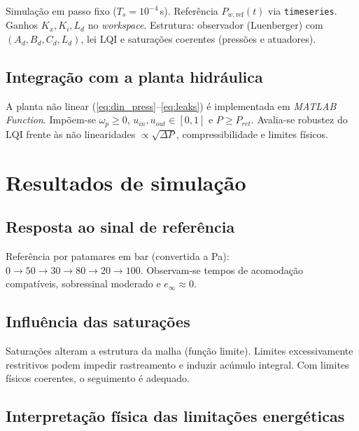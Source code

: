 Simulação em passo fixo ($T_s=10^{-4}$\,s). Referência $P_{w,\mathrm{ref}}(t)$ via \texttt{timeseries}. Ganhos $K_x,K_i,L_d$ no \emph{workspace}. Estrutura: observador (Luenberger) com $(A_d,B_d,C_d,L_d)$, lei LQI e saturações coerentes (pressões e atuadores).

\subsection{Integração com a planta hidráulica}
\label{sec:integracao-planta-hidraulica}

A planta não linear (\eqref{eq:din_press}–\eqref{eq:leaks}) é implementada em \emph{MATLAB Function}. Impõem-se $\omega_p\ge0$, $u_{in},u_{out}\in[0,1]$ e $P\ge P_{ret}$. Avalia-se robustez do LQI frente às não linearidades $\propto\sqrt{\Delta P}$, compressibilidade e limites físicos.

\section{Resultados de simulação}
\label{sec:resultados-simulacao}

\subsection{Resposta ao sinal de referência}
\label{sec:resposta-sinal-referencia}

Referência por patamares em bar (convertida a Pa): $0\!\to\!50\!\to\!30\!\to\!80\!\to\!20\!\to\!100$. Observam-se tempos de acomodação compatíveis, sobressinal moderado e $e_\infty\!\approx\!0$.

\subsection{Influência das saturações}
\label{sec:influencia-saturacoes}

Saturações alteram a estrutura da malha (função limite). Limites excessivamente restritivos podem impedir rastreamento e induzir acúmulo integral. Com limites físicos coerentes, o seguimento é adequado.

\subsection{Interpretação física das limitações energéticas}
\label{sec:interpretacao-limitacoes-energeticas}

